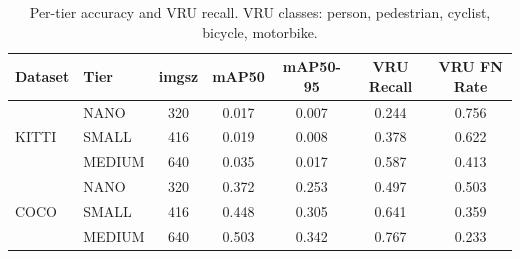 \begin{table}[t]
\centering
\caption{Per-tier accuracy and VRU recall. VRU classes: person, pedestrian, cyclist, bicycle, motorbike.}
\label{tab:accuracy_per_tier}
\begin{tabular}{llccccc}
\toprule
Dataset & Tier & imgsz & mAP50 & mAP50-95 & VRU Recall & VRU FN Rate \\
\midrule
\multirow{3}{*}{KITTI} & NANO & 320 & 0.017 & 0.007 & 0.244 & 0.756 \\
 & SMALL & 416 & 0.019 & 0.008 & 0.378 & 0.622 \\
 & MEDIUM & 640 & 0.035 & 0.017 & 0.587 & 0.413 \\
\midrule
\multirow{3}{*}{COCO} & NANO & 320 & 0.372 & 0.253 & 0.497 & 0.503 \\
 & SMALL & 416 & 0.448 & 0.305 & 0.641 & 0.359 \\
 & MEDIUM & 640 & 0.503 & 0.342 & 0.767 & 0.233 \\
\bottomrule
\end{tabular}
\end{table}